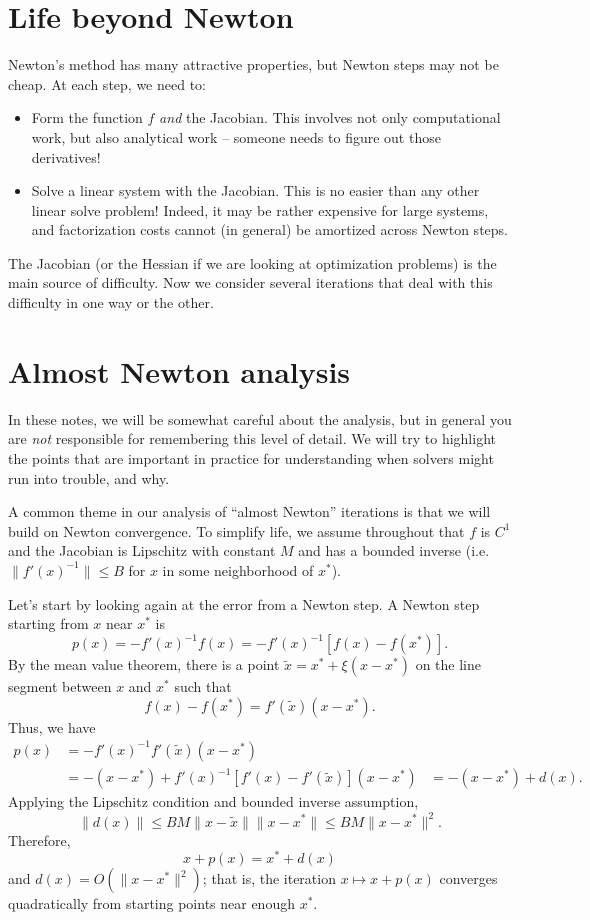 \documentclass[12pt, leqno]{article} %
\begin{document}

\section{Life beyond Newton}

Newton's method has many attractive properties, but Newton steps
may not be cheap.  At each step, we need to:
\begin{itemize}
\item Form the function $f$ {\em and} the Jacobian.  This involves not
  only computational work, but also analytical work -- someone needs
  to figure out those derivatives!
\item Solve a linear system with the Jacobian.  This is no easier than
  any other linear solve problem!  Indeed, it may be rather expensive
  for large systems, and factorization costs cannot (in general) be
  amortized across Newton steps.
\end{itemize}
The Jacobian (or the Hessian if we are looking at optimization
problems) is the main source of difficulty.  Now we consider several
iterations that deal with this difficulty in one way or the other.

\section{Almost Newton analysis}

In these notes, we will be somewhat careful about the analysis, but in
general you are {\em not} responsible for remembering this level of
detail.  We will try to highlight the points that are important in
practice for understanding when solvers might run into trouble, and why.

A common theme in our analysis of ``almost Newton'' iterations is that
we will build on Newton convergence.  To simplify life, we
assume throughout that $f$ is $C^1$ and the Jacobian is Lipschitz with
constant $M$ and has a bounded inverse (i.e.~$\|f'(x)^{-1}\| \leq B$
for $x$ in some neighborhood of $x^*$).

Let's start by looking again at the error from a Newton step.
A Newton step starting from $x$ near $x^*$ is
\[
  p(x) = -f'(x)^{-1} f(x) = -f'(x)^{-1} [f(x)-f(x^*)].
\]
By the mean value theorem, there is a point
$\tilde{x} = x^* + \xi (x-x^*)$ on the line segment between
$x$ and $x^*$ such that
\[
  f(x)-f(x^*) = f'(\tilde{x}) (x-x^*).
\]
Thus, we have
\begin{align*}
  p(x)
  &= -f'(x)^{-1} f'(\tilde{x}) (x-x^*) \\
  &= -(x-x^*) + f'(x)^{-1} [f'(x)-f'(\tilde{x})](x-x^*)
  &= -(x-x^*) + d(x).
\end{align*}
Applying the Lipschitz condition and bounded inverse assumption,
\[
  \|d(x)\| \leq BM \|x-\tilde{x}\|\|x-x^*\| \leq BM \|x-x^*\|^2.
\]
Therefore,
\[
  x + p(x) = x^* + d(x)
\]
and $d(x) = O(\|x-x^*\|^2)$; that is, the iteration
$x \mapsto x + p(x)$ converges quadratically from starting points
near enough $x^*$.
\end{document}
